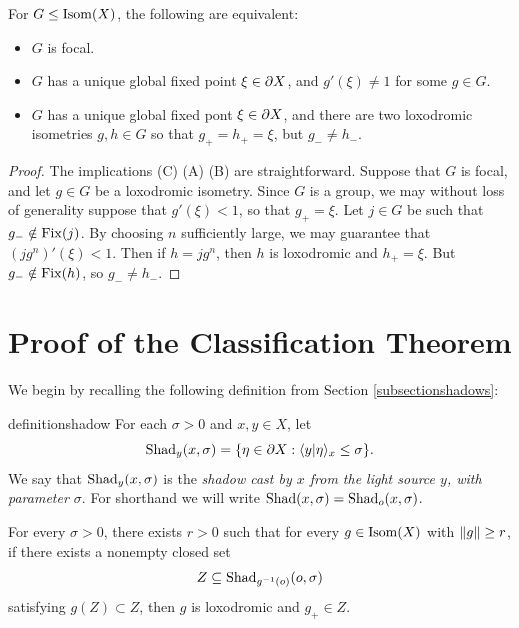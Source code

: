 \begin{proposition}
\label{propositionfocalequivalent}
For $G\leq\operatorname{Isom}(X)$, the following are equivalent:
\begin{itemize}
\item[(A)] $G$ is focal.
\item[(B)] $G$ has a unique global fixed point $\xi\in\partial X$, and $g'(\xi)\neq 1$ for some $g\in G$.
\item[(C)] $G$ has a unique global fixed pont $\xi\in\partial X$, and there are two loxodromic isometries $g,h\in G$ so that $g_+ = h_+ = \xi$, but $g_- \neq h_-$.
\end{itemize}
\end{proposition}
\begin{proof}
The implications (C) \implies (A) \iff (B) are straightforward. Suppose that $G$ is focal, and let $g\in G$ be a loxodromic isometry. Since $G$ is a group, we may without loss of generality suppose that $g'(\xi) < 1$, so that $g_+ = \xi$. Let $j\in G$ be such that $g_-\notin\operatorname{Fix}(j)$. By choosing $n$ sufficiently large, we may guarantee that $(jg^n)'(\xi) < 1$. Then if $h = jg^n$, then $h$ is loxodromic and $h_+ = \xi$. But $g_-\notin \operatorname{Fix}(h)$, so $g_-\neq h_-$.
\end{proof}


\bigskip
\section{Proof of the Classification Theorem}

We begin by recalling the following definition from Section \ref{subsectionshadows}:
\begin{repdefinition}{definitionshadow}
For each $\sigma > 0$ and $x,y\in X$, let
\[
\operatorname{Shad}_y(x,\sigma) = \{\eta\in\partial X:\langle y|\eta\rangle_x\leq\sigma\}.
\]
We say that $\operatorname{Shad}_y(x,\sigma)$ is the \emph{shadow cast by $x$ from the light source $y$, with parameter $\sigma$}. For shorthand we will write $\operatorname{Shad}(x,\sigma) = \operatorname{Shad}_o(x,\sigma)$.
\end{repdefinition}

\begin{lemma}
\label{lemmaloxodromic}
For every $\sigma > 0$, there exists $r > 0$ such that for every $g\in\operatorname{Isom}(X)$ with $\|g\| \geq r$, if there exists a nonempty closed set
\[
Z \subseteq \operatorname{Shad}_{g^{-1}(o)}(o,\sigma)
\]
satisfying $g(Z) \subset Z$, then $g$ is loxodromic and $g_+\in Z$.
\end{lemma}

